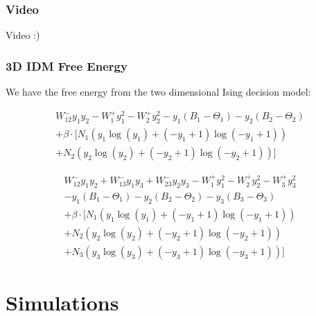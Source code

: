 \documentclass[xcolor={fixpdftex,hyperref,x11names},10pt,pdftex,hyperref={pdftex}]{beamer}
\begin{document}
\begin{frame}
  \frametitle{Video}
  Video :)
\end{frame}

\begin{frame}
  \frametitle{3D IDM Free Energy}
  We have the free energy from the two dimensional Ising decision model:

\begin{equation*}
    \begin{split}
    W^-_{12} y_{1} y_{2} - W^+_{1} y_{1}^{2} - W^+_{2} y_{2}^{2} - y_{1}
    (B_{1} - \Theta_{1}) - y_{2} (B_{2} - \Theta_{2})\\
    + \beta \cdot [N_{1} (y_{1} \operatorname{log}(y_{1}) + (- y_{1} + 1)
    \operatorname{log}(- y_{1} + 1))\\
    + N_{2} (y_{2} \operatorname{log}(y_{2}) + (- y_{2} + 1)
    \operatorname{log}(- y_{2} + 1))]
    \end{split}
\end{equation*}

\begin{equation*}
    \begin{split}
    W^-_{12} y_{1} y_{2} + W^-_{13} y_{1} y_{3} + W^-_{23} y_{2} y_{3} -
    W^+_{1} y_{1}^{2} - W^+_{2} y_{2}^{2} - W^+_{3} y_{3}^{2} \\
    - y_{1} (B_{1} - \Theta_{1}) - y_{2} (B_{2} -
    \Theta_{2}) - y_{3} (B_{3} - \Theta_{3}) \\
    + \beta \cdot [N_{1} (y_{1} \operatorname{log}(y_{1}) + (- y_{1} + 1)
    \operatorname{log}(- y_{1} + 1))\\
    + N_{2} (y_{2} \operatorname{log}(y_{2}) + (- y_{2} + 1)
    \operatorname{log}(- y_{2} + 1))\\
    + N_{3} (y_{3} \operatorname{log}(y_{3}) + (- y_{3} +
    1) \operatorname{log}(- y_{3} + 1))]
    \end{split}
\end{equation*}
\end{frame}

\section{Simulations}
\label{sec:simu}
\end{document}
